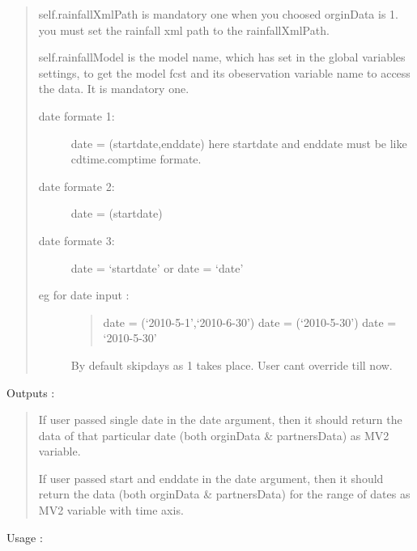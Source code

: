 \documentclass[letterpaper,10pt,english]{sphinxmanual}
\begin{document}
\begin{fulllineitems}
\begin{fulllineitems}
\begin{quote}
self.rainfallXmlPath is mandatory one when you choosed orginData
is 1. you must set the rainfall xml path to the rainfallXmlPath.

self.rainfallModel is the model name, which has set in the global
variables settings, to get the model fcst and its obeservation
variable name to access the data. It is mandatory one.
\begin{description}
\item[{date formate 1:}] \leavevmode
date = (startdate,enddate)
here startdate and enddate must be like cdtime.comptime formate.

\item[{date formate 2:}] \leavevmode
date = (startdate)

\item[{date formate 3:}] \leavevmode
date = `startdate' or date = `date'

\item[{eg for date input :}] \leavevmode\begin{quote}

date = (`2010-5-1',`2010-6-30')
date = (`2010-5-30')
date = `2010-5-30'
\end{quote}

By default skipdays as 1 takes place. User cant override till now.

\end{description}
\end{quote}

Outputs :
\begin{quote}

If user passed single date in the date argument, then it should
return the data of that particular date
(both orginData \& partnersData) as MV2 variable.

If user passed start and enddate in the date argument, then it
should return the data (both orginData \& partnersData) for the
range of dates as MV2 variable with time axis.
\end{quote}

Usage :
\begin{quote}
\begin{quote}


\end{quote}
\end{quote}
\end{fulllineitems}
\end{fulllineitems}
\end{document}
